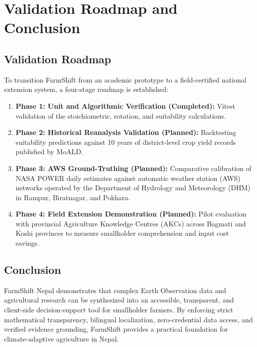 \documentclass[11pt,a4paper]{report}
\begin{document}
\chapter{Validation Roadmap and Conclusion}

\section{Validation Roadmap}
To transition FarmShift from an academic prototype to a field-certified national extension system, a four-stage roadmap is established:
\begin{enumerate}
  \item \textbf{Phase 1: Unit and Algorithmic Verification (Completed):} Vitest validation of the stoichiometric, rotation, and suitability calculations.
  \item \textbf{Phase 2: Historical Reanalysis Validation (Planned):} Backtesting suitability predictions against 10 years of district-level crop yield records published by MoALD.
  \item \textbf{Phase 3: AWS Ground-Truthing (Planned):} Comparative calibration of NASA POWER daily estimates against automatic weather station (AWS) networks operated by the Department of Hydrology and Meteorology (DHM) in Rampur, Biratnagar, and Pokhara.
  \item \textbf{Phase 4: Field Extension Demonstration (Planned):} Pilot evaluation with provincial Agriculture Knowledge Centres (AKCs) across Bagmati and Koshi provinces to measure smallholder comprehension and input cost savings.
\end{enumerate}

\section{Conclusion}
FarmShift Nepal demonstrates that complex Earth Observation data and agricultural research can be synthesized into an accessible, transparent, and client-side decision-support tool for smallholder farmers. By enforcing strict mathematical transparency, bilingual localization, zero-credential data access, and verified evidence grounding, FarmShift provides a practical foundation for climate-adaptive agriculture in Nepal.



\end{document}
